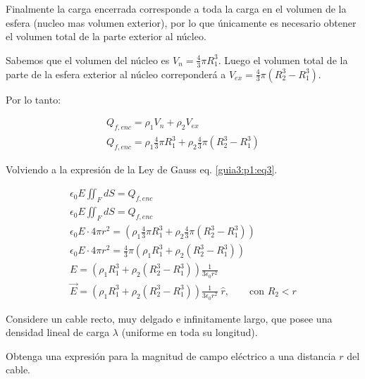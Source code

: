 \documentclass[11pt]{article}
\begin{document}
\begin{solucion}
    Finalmente la carga encerrada corresponde a toda la carga en el volumen de la esfera (nucleo mas volumen exterior), por lo que únicamente es necesario obtener el volumen total de la parte exterior al núcleo.

    Sabemos que el volumen del núcleo es $V_n = \frac{4}{3}\pi R_1^3$. Luego el volumen total de la parte de la esfera exterior al núcleo correponderá a $V_{ex} = \frac{4}{3}\pi (R_2^3 - R_1^3)$.

    Por lo tanto:

    \begin{gather}
        Q_{f, enc} = \rho_1 V_n + \rho_2 V_{ex}
        \\
        Q_{f, enc} = \rho_1 \frac{4}{3}\pi R_1^3 + \rho_2 \frac{4}{3}\pi (R_2^3 - R_1^3)
    \end{gather}

    Volviendo a la expresión de la Ley de Gauss eq. \ref{guia3:p1:eq3}.

    \begin{gather}
        \epsilon_0E \iint_F dS = Q_{f, enc}
        \\
        \epsilon_0E \iint_F dS = Q_{f, enc}
        \\
        \epsilon_0 E \cdot 4\pi r^2 = \left(\rho_1 \frac{4}{3}\pi R_1^3 + \rho_2 \frac{4}{3}\pi (R_2^3 - R_1^3)\right)
        \\
        \epsilon_0 E \cdot 4\pi r^2 = \frac{4}{3}\pi \left(\rho_1 R_1^3 + \rho_2 (R_2^3 - R_1^3)\right)
        \\
        E = \left(\rho_1 R_1^3 + \rho_2 (R_2^3 - R_1^3)\right)\frac{1}{3\epsilon_0r^2}
        \\
        \vec{E} = \left(\rho_1 R_1^3 + \rho_2 (R_2^3 - R_1^3)\right)\frac{1}{3\epsilon_0r^2}\;\hat{r},\qquad \text{con }R_2<r
    \end{gather}
\end{solucion}

Considere un cable recto, muy delgado e infinitamente largo, que posee una densidad lineal de carga $\lambda$ (uniforme en toda su longitud).

Obtenga una expresión para la magnitud de campo eléctrico a una distancia $r$ del cable.

\begin{figure}[H]
    \centering
    \shorthandoff{>}
    \shorthandon{>}
\end{figure}
\end{document}
